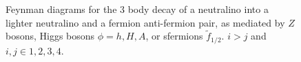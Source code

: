\documentclass[final,3p,times,pdflatex]{elsarticle}
\begin{document}
\begin{figure}
  \caption{Feynman diagrams for the 3 body decay of a neutralino into a lighter neutralino and a fermion anti-fermion pair, as mediated by $Z$ bosons, Higgs bosons $\phi = h,H,A$, or sfermions $\tilde{f}_{1/2}$. $i>j$ and ${i,j}\in{1,2,3,4}$.} \label{neutneutffbardiag}
\end{figure} 
\end{document}
